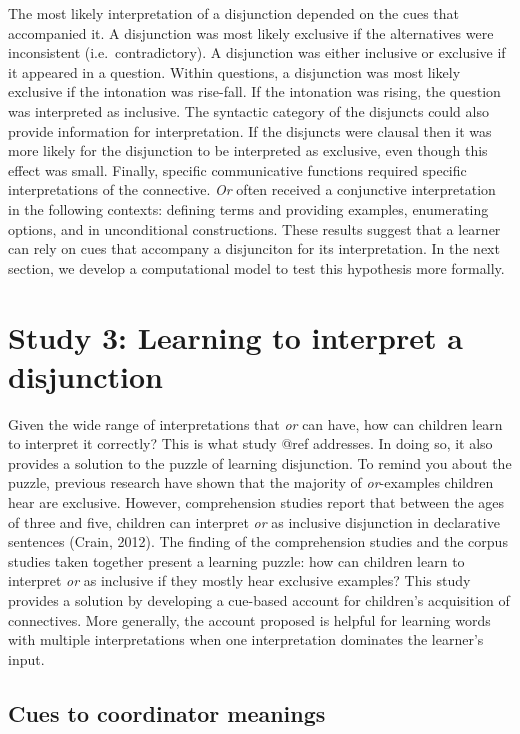 \documentclass[,man,floatsintext]{apa6}
\begin{document}
The most likely interpretation of a disjunction depended on the cues that accompanied it. A disjunction was most likely exclusive if the alternatives were inconsistent (i.e.~contradictory). A disjunction was either inclusive or exclusive if it appeared in a question. Within questions, a disjunction was most likely exclusive if the intonation was rise-fall. If the intonation was rising, the question was interpreted as inclusive. The syntactic category of the disjuncts could also provide information for interpretation. If the disjuncts were clausal then it was more likely for the disjunction to be interpreted as exclusive, even though this effect was small. Finally, specific communicative functions required specific interpretations of the connective. \emph{Or} often received a conjunctive interpretation in the following contexts: defining terms and providing examples, enumerating options, and in unconditional constructions. These results suggest that a learner can rely on cues that accompany a disjunciton for its interpretation. In the next section, we develop a computational model to test this hypothesis more formally.

\hypertarget{study-3-learning-to-interpret-a-disjunction}{%
\section{Study 3: Learning to interpret a disjunction}\label{study-3-learning-to-interpret-a-disjunction}}

Given the wide range of interpretations that \emph{or} can have, how can children learn to interpret it correctly? This is what study @ref addresses. In doing so, it also provides a solution to the puzzle of learning disjunction. To remind you about the puzzle, previous research have shown that the majority of \emph{or}-examples children hear are exclusive. However, comprehension studies report that between the ages of three and five, children can interpret \emph{or} as inclusive disjunction in declarative sentences (Crain, 2012). The finding of the comprehension studies and the corpus studies taken together present a learning puzzle: how can children learn to interpret \emph{or} as inclusive if they mostly hear exclusive examples? This study provides a solution by developing a cue-based account for children's acquisition of connectives. More generally, the account proposed is helpful for learning words with multiple interpretations when one interpretation dominates the learner's input.

\hypertarget{cues-to-coordinator-meanings}{%
\subsection{Cues to coordinator meanings}\label{cues-to-coordinator-meanings}}
\end{document}
